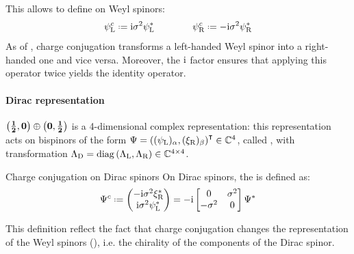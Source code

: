 This allows to define  on Weyl spinors:
\begin{equation}
  \psi_\text{L}^c \defeq \img \sigma^2 \psi_\text{L}^*
  \qquad \qquad
  \psi_\text{R}^c \defeq -\img \sigma^2 \psi_\text{R}^*
\end{equation}
As of , charge conjugation transforms a left-handed Weyl spinor into a right-handed one and vice versa. Moreover, the $ \mathrm{i} $ factor ensures that applying this operator twice yields the identity operator.

\paragraph{Dirac representation}

$ \mathbf{\left( \frac{1}{2},0 \right)} \oplus \mathbf{\left( 0,\frac{1}{2} \right)} $ is a 4-dimensional complex representation: this representation acts on bispinors of the form $ \Psi = \left( (\psi_\text{L})_\alpha, (\xi_\text{R})_\beta \right)^\intercal \in \mathbb{C}^4 $, called , with transformation $ \Lambda_\text{D} = \operatorname{diag} \left( \Lambda_\text{L}, \Lambda_\text{R} \right) \in \mathbb{C}^{4 \times 4} $.

\begin{definition}{Charge conjugation on Dirac spinors}{}
  On Dirac spinors, the  is defined as:
  \begin{equation}
    \Psi^c \defeq
    \begin{pmatrix}
      - \img \sigma^2 \xi_\text{R}^* \\
      \img \sigma^2 \psi_\text{L}^*
    \end{pmatrix}
    = -\img
    \begin{bmatrix}
      0 & \sigma^2 \\ -\sigma^2 & 0
    \end{bmatrix}
    \Psi^*
    \label{eq:dir-spin-charge-conj}
  \end{equation}
\end{definition}

This definition reflect the fact that charge conjugation changes the representation of the Weyl spinors (), i.e. the chirality of the components of the Dirac spinor.

